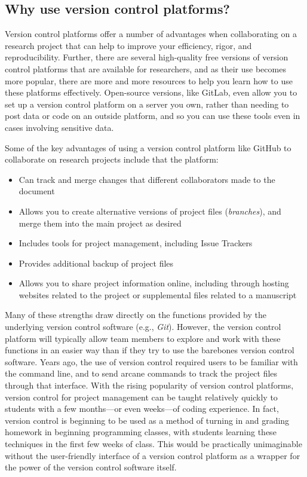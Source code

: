 \documentclass[]{tufte-book}
\providecommand{\tightlist}{%
  \setlength{\itemsep}{0pt}\setlength{\parskip}{0pt}}
\begin{document}
\subsection{Why use version control platforms?}\label{why-use-version-control-platforms}

Version control platforms offer a number of advantages when collaborating on a
research project that can help to improve your efficiency, rigor, and
reproducibility. Further, there are several high-quality free versions of
version control platforms that are available for researchers, and as their use
becomes more popular, there are more and more resources to help you learn how to
use these platforms effectively. Open-source versions, like GitLab, even allow
you to set up a version control platform on a server you own, rather than
needing to post data or code on an outside platform, and so you can use these
tools even in cases involving sensitive data.

Some of the key advantages of using a version control platform like GitHub
to collaborate on research projects include that the platform:

\begin{itemize}
\tightlist
\item
  Can track and merge changes that different collaborators made to the
  document
\item
  Allows you to create alternative versions of project files (\emph{branches}), and merge them into the main project as desired
\item
  Includes tools for project management, including Issue Trackers
\item
  Provides additional backup of project files
\item
  Allows you to share project information online, including through hosting websites related to the project or supplemental files related to a manuscript
\end{itemize}

Many of these strengths draw directly on the functions provided by the
underlying version control software (e.g., \emph{Git}). However, the version control
platform will typically allow team members to explore and work with these
functions in an easier way than if they try to use the barebones version control
software. Years ago, the use of version control required users to
be familiar with the command line, and to send arcane commands to track the
project files through that interface. With the rising popularity of version
control platforms, version control for project management can be taught
relatively quickly to students with a few months---or even weeks---of coding
experience. In fact, version control is beginning to be used as a method of
turning in and grading homework in beginning programming classes, with students
learning these techniques in the first few weeks of class. This would be
practically unimaginable without the user-friendly interface of a version
control platform as a wrapper for the power of the version control software
itself.
\end{document}
